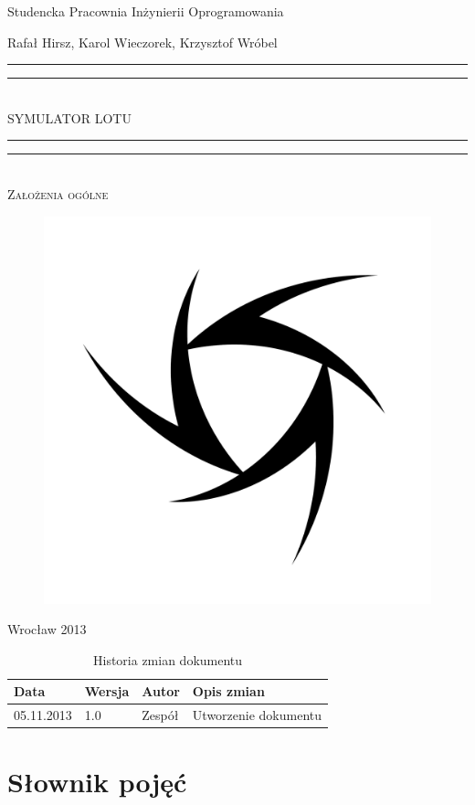 \documentclass{mwrep}
\newcommand*{\titleGP}{\begingroup
\centering

{\Large Studencka Pracownia Inżynierii Oprogramowania}\par
\vspace*{16\baselineskip}

{\LARGE Rafał Hirsz, Karol Wieczorek, Krzysztof Wróbel\par}
\vspace*{\baselineskip}

\rule{\textwidth}{1.6pt}\vspace*{-\baselineskip}\vspace*{2pt}
\rule{\textwidth}{0.4pt}\\[\baselineskip]

{\Huge SYMULATOR LOTU}\\[0.2\baselineskip]

\rule{\textwidth}{0.4pt}\vspace*{-\baselineskip}\vspace{3.2pt}
\rule{\textwidth}{1.6pt}\\[\baselineskip]

\scshape
{\huge Założenia ogólne}\par
\vspace*{2\baselineskip}

\begin{figure}[h]
\centering
\includegraphics[width=5\baselineskip]{flightsim-team-logo.pdf}
\end{figure}
\vfill

{\large Wrocław 2013}\par

\pagebreak

\endgroup}
\begin{document}
\thispagestyle{empty}
\titleGP

\begin{center}
\begin{table}[h]
\begin{center}
\begin{tabularx}{1\textwidth}{|l|l|l|X|}
\hline
Data & Wersja & Autor & Opis zmian \\ \hline
05.11.2013 & 1.0 & Zespół & Utworzenie dokumentu
\end{tabularx}
\end{center}
\vspace{3ex}
\caption{Historia zmian dokumentu}\label{T:Zmiany}
\end{table}
\end{center}

\pagebreak

\tableofcontents

\chapter{Słownik pojęć}
\end{document}
